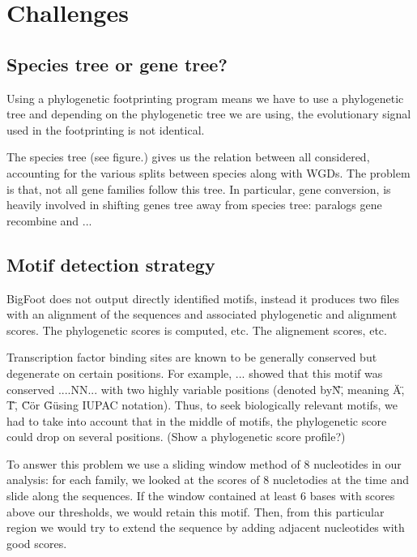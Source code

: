 \section*{Challenges}



\subsection*{Species tree or gene tree?}


Using a phylogenetic footprinting program means we have to use a phylogenetic tree and depending on the phylogenetic tree we are using, the evolutionary signal used in the footprinting is not identical.

The species tree (see figure.) gives us the relation between all considered, accounting for the various splits between species along with WGDs. The problem is that, not all gene families follow this tree. In particular, gene conversion, is heavily involved in shifting genes tree away from species tree: paralogs gene recombine and ...



\subsection*{Motif detection strategy}


BigFoot does not output directly identified motifs, instead it produces two files with an alignment of the sequences and associated phylogenetic and alignment scores. The phylogenetic scores is computed, etc. The alignement scores, etc.

Transcription factor binding sites are known to be generally conserved but degenerate on certain positions. For example, ... showed that this motif was conserved ....NN... with two highly variable positions (denoted by\"N\", meaning \"A\", \"T\", \"C\" or \"G\" using IUPAC notation). Thus, to seek biologically relevant motifs, we had to take into account that in the middle of motifs, the phylogenetic score could drop on several positions. (Show a phylogenetic score profile?)

To answer this problem we use a sliding window method of 8 nucleotides in our analysis: for each family, we looked at the scores of 8 nucletodies at the time and slide along the sequences. If the window contained at least 6 bases with scores above our thresholds, we would retain this motif. Then, from this particular region we would try to extend the sequence by adding adjacent nucleotides with good scores.



